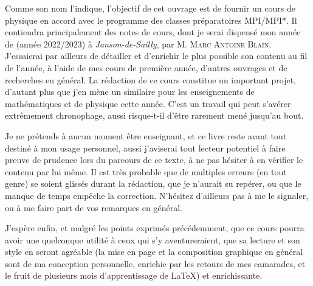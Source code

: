 \documentclass[a4paper,french,bookmarks]{book}
\begin{document}
    \newline\newline\newline
    
    \begin{center}
        \begin{minipage}{0.85\linewidth}
            \large \qquad Comme son nom l'indique, l'objectif de cet ouvrage est de fournir un cours de physique en accord avec le programme des classes préparatoires \textsf{MPI/MPI*}. Il contiendra principalement des notes de cours, dont je serai dispensé mon année de  (année 2022/2023) à \textit{Janson-de-Sailly}, par M. \textsc{Marc Antoine Blain}. J'essaierai par ailleurs de détailler et d'enrichir le plus possible son contenu au fil de l'année, à l'aide de mes cours de première année, d'autres ouvrages et de recherches en général. La rédaction de ce cours constitue un important projet, d'autant plus que j'en mène un similaire pour les enseignements de mathématiques et de physique cette année. C'est un travail qui peut s'avérer extrêmement chronophage, aussi risque-t-il d'être rarement mené jusqu'au bout.\newline
    
            \qquad Je ne prétends à aucun moment être enseignant, et ce livre reste avant tout destiné à mon usage personnel, aussi j'aviserai tout lecteur potentiel à faire preuve de prudence lors du parcours de ce texte, à ne pas hésiter à en vérifier le contenu par lui même. Il est très probable que de multiples erreurs (en tout genre) se soient glissés durant la rédaction, que je n'aurait su repérer, ou que le manque de temps empêche la correction. N'hésitez d'ailleurs pas à me le signaler, ou à me faire part de vos remarques en général.\newline
    
            \qquad J'espère enfin, et malgré les points exprimés précédemment, que ce cours pourra avoir une quelconque utilité à ceux qui s'y aventureraient, que sa lecture et son style en seront agréable (la mise en page et la composition graphique en général sont de ma conception personnelle, enrichie par les retours de mes camarades, et le fruit de plusieurs mois d'apprentissage de \LaTeX) et enrichissante.\newline\newline\newline\text{}
        \end{minipage}
    \end{center}
    
\end{document}
